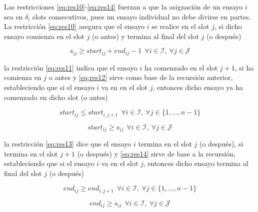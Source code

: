 \documentclass[journal, 10pt]{IEEEtran}
\begin{document}
\begin{itemize}
Las restricciones \eqref{eq:res10}-\eqref{eq:res14} fuerzan a que la asignación de un ensayo $i$ sea en $\delta_i$ slots consecutivos, pues un ensayo individual no debe divirse en partes. La restricción \eqref{eq:res10} asegura que el ensayo $i$ se realice en el slot $j$, si dicho ensayo comienza en el slot $j$ (o antes) y termina al final del slot $j$ (o después)	 

\begin{equation}\label{eq:res10} 
	s_{ij} \geq start_{ij} + end_{ij} -1 \ \ \forall i \in \mathcal{I}, \ \forall j \in \mathcal{J}
\end{equation}

la restricción \eqref{eq:res11} indica que el ensayo $i$ ha comenzado en el slot $j+1$, si ha comienza en $j$ o antes y \eqref{eq:res12} sirve como base de la recursión anterior, estableciendo que si el ensayo $i$ va en en el slot $j$, entonces dicho ensayo ya ha comenzado en dicho slot (o antes)

\begin{equation}\label{eq:res11} 
	start_{ij} \leq start_{i,j+1} \ \ \forall i \in \mathcal{I}, \ \forall j \in \{1,\ldots,n-1\}
\end{equation}  

\begin{equation}\label{eq:res12} 
	start_{ij} \geq s_{ij} \ \ \forall i \in \mathcal{I}, \ \forall j \in \mathcal{J}
\end{equation}

la restricción \eqref{eq:res13} dice que el ensayo $i$ termina en el slot $j$ (o después), si termina en el slot $j+1$ (o después) y \eqref{eq:res14} sirve de base a la recursión, estableciendo que si el ensayo $i$ va en el slot $j$, entonces dicho ensayo termina al final del slot $j$ (o después)  

\begin{equation}\label{eq:res13} 
	end_{ij} \geq end_{i,j+1} \ \ \forall i \in \mathcal{I}, \ \forall j \in \{1,\ldots,n-1\}
\end{equation} 

\begin{equation}\label{eq:res14} 
	end_{ij} \geq s_{ij} \ \ \forall i \in \mathcal{I}, \ \forall j \in \mathcal{J}
\end{equation}	

\end{itemize}  
\end{document}
